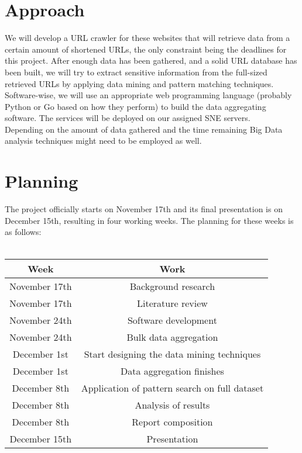 \documentclass{article}
\begin{document}
\section{Approach}
We will develop a URL crawler for these websites that will retrieve data from a certain amount of shortened URLs, the only constraint being the deadlines for this project. After enough data has been gathered, and a solid URL database has been built, we will try to extract sensitive information from the full-sized retrieved URLs by applying data mining and pattern matching techniques. \\
Software-wise, we will use an appropriate web programming language (probably Python or Go based on how they perform) to build the data aggregating software. The services will be deployed on our assigned SNE servers.\\
Depending on the amount of data gathered and the time remaining Big Data analysis techniques might need to be employed as well. 

\section{Planning}
The project officially starts on November 17th and its final presentation is on December 15th, resulting in four working weeks. The planning for these weeks is as follows:
\\\\
\begin{table}[h]
  \label{tbl:example}
  \begin{tabular}{|c|c|}
    \hline
    Week  & Work \\
    \hline
    November 17th & Background research \\
    \hline
    November 17th & Literature review   \\
    \hline
    November 24th & Software development \\
    \hline
    November 24th & Bulk data aggregation \\
    \hline
    December 1st & Start designing the data mining techniques\\
    \hline
    December 1st & Data aggregation finishes\\
    \hline
    December 8th & Application of pattern search on full dataset \\
    \hline
    December 8th & Analysis of results \\
    \hline
    December 8th & Report composition  \\
    \hline
    December 15th & Presentation \\
    \hline
  \end{tabular}
\end{table}
\end{document}
